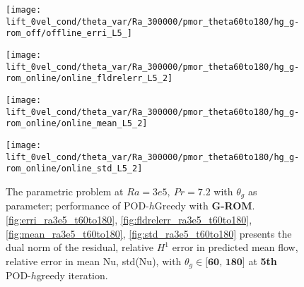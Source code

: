 \begin{figure}[h!]
    \begin{minipage}[b]{.25\linewidth}
        \centering \texttt{[image: lift\_0vel\_cond/theta\_var/Ra\_300000/pmor\_theta60to180/hg\_g-rom\_off/offline\_erri\_L5\_]}
        \label{fig:erri_ra3e5_t60to180}
    \end{minipage}%
    \begin{minipage}[b]{.25\linewidth}
        \centering \texttt{[image: lift\_0vel\_cond/theta\_var/Ra\_300000/pmor\_theta60to180/hg\_g-rom\_online/online\_fldrelerr\_L5\_2]}
        \label{fig:fldrelerr_ra3e5_t60to180}
    \end{minipage}
    \begin{minipage}[b]{.25\linewidth}
        \centering \texttt{[image: lift\_0vel\_cond/theta\_var/Ra\_300000/pmor\_theta60to180/hg\_g-rom\_online/online\_mean\_L5\_2]}
        \label{fig:mean_ra3e5_t60to180}
    \end{minipage}%
    \begin{minipage}[b]{.25\linewidth}
        \centering \texttt{[image: lift\_0vel\_cond/theta\_var/Ra\_300000/pmor\_theta60to180/hg\_g-rom\_online/online\_std\_L5\_2]}
        \label{fig:std_ra3e5_t60to180}
    \end{minipage} 
    \caption{The parametric problem at $Ra=3e5,~Pr=7.2$ with $\theta_g$ as
    parameter; performance of POD-$h$Greedy with \textbf{G-ROM}.  \ref{fig:erri_ra3e5_t60to180},
    \ref{fig:fldrelerr_ra3e5_t60to180}, \ref{fig:mean_ra3e5_t60to180}, \ref{fig:std_ra3e5_t60to180}
    presents the dual norm of the residual, relative $H^1$ error in predicted
    mean flow, relative error in mean Nu, std(Nu), with $\theta_g \in
    \textbf{[60,~180]}$ at \textbf{5th} POD-$h$greedy iteration.}
    \label{fig:online_ra3e5_t60to180} 
\end{figure}

